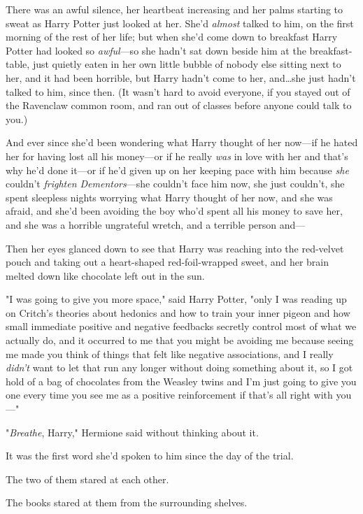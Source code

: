 There was an awful silence, her heartbeat increasing and her palms starting to
sweat as Harry Potter just looked at her. She’d \emph{almost} talked to him, on
the first morning of the rest of her life; but when she’d come down to
breakfast Harry Potter had looked so \emph{awful}—so she hadn’t sat down
beside him at the breakfast-table, just quietly eaten in her own little bubble
of nobody else sitting next to her, and it had been horrible, but Harry hadn’t
come to her, and…she just hadn’t talked to him, since then. (It wasn’t
hard to avoid everyone, if you stayed out of the Ravenclaw common room, and ran
out of classes before anyone could talk to you.)

And ever since she’d been wondering what Harry thought of her now—if he hated
her for having lost all his money—or if he really \emph{was} in love with her
and that’s why he’d done it—or if he’d given up on her keeping pace with him
because \emph{she} couldn’t \emph{frighten Dementors}—she couldn’t face him
now, she just couldn’t, she spent sleepless nights worrying what Harry thought
of her now, and she was afraid, and she’d been avoiding the boy who’d spent all
his money to save her, and she was a horrible ungrateful wretch, and a terrible
person and—

Then her eyes glanced down to see that Harry was reaching into the red-velvet
pouch and taking out a heart-shaped red-foil-wrapped sweet, and her brain
melted down like chocolate left out in the sun.

"I was going to give you more space," said Harry Potter, "only I was reading up
on Critch’s theories about hedonics and how to train your inner pigeon and how
small immediate positive and negative feedbacks secretly control most of what
we actually do, and it occurred to me that you might be avoiding me because
seeing me made you think of things that felt like negative associations, and I
really \emph{didn’t} want to let that run any longer without doing something
about it, so I got hold of a bag of chocolates from the Weasley twins and I’m
just going to give you one every time you see me as a positive reinforcement if
that’s all right with you—"

"\emph{Breathe}, Harry," Hermione said without thinking about it.

It was the first word she’d spoken to him since the day of the trial.

The two of them stared at each other.

The books stared at them from the surrounding shelves.

